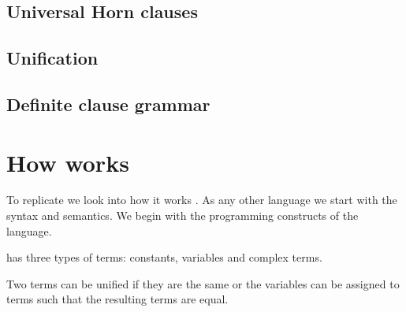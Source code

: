 \documentclass[thesis-solanki.tex]{subfiles}
\begin{document}
\subsection{Universal Horn clauses}


\subsection{Unification}



\subsection{Definite clause grammar}

\section{How  works}

To replicate  we look into how it works .
%
As any other language we start with the syntax and semantics.
We begin with the programming constructs of the language.

 has three types of terms: constants, variables and complex terms.

Two terms can be unified if they are the same or the variables can be assigned to terms such that the resulting
terms are equal.
\end{document}

